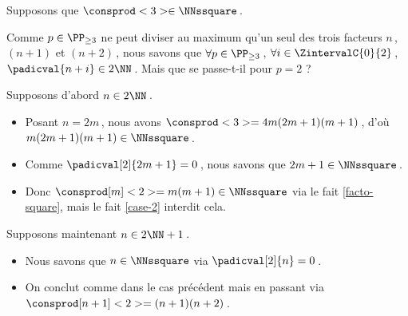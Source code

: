 Supposons que $\consprod<3> \in \NNssquare$\,.

\smallskip

Comme $p \in \PP_{\geq 3}$ ne peut diviser au maximum qu'un seul des trois facteurs $n$\,, $(n+1)$ et $(n+2)$\,, nous savons que 
$\forall p \in \PP_{\geq 3}$\,, 
$\forall i \in \ZintervalC{0}{2}$\,, 
$\padicval{n + i} \in 2 \NN$\,.
Mais que se passe-t-il pour $p = 2$ ?

\medskip

Supposons d'abord $n \in 2 \NN$\,.
%
\begin{itemize}
	\item Posant $n = 2 m$\,, nous avons $\consprod<3> = 4 m(2m+1)(m+1)$\,, d'où $m(2m+1)(m+1) \in \NNssquare$\,.
		
	\item Comme $\padicval[2]{2m+1} = 0$\,, nous savons que $2m+1 \in \NNssquare$\,.
		
	\item Donc $\consprod[m]<2> = m(m+1)\in \NNssquare$ via le fait \ref{facto-square}, mais le fait \ref{case-2} interdit cela.
\end{itemize}

\medskip

Supposons maintenant $n \in 2 \NN + 1$\,.
%
\begin{itemize}
	\item Nous savons que $n \in \NNssquare$ via $\padicval[2]{n} = 0$\,.

	\item On conclut comme dans le cas précédent mais en passant via $\consprod[n+1]<2>=(n+1)(n+2)$\,. \qedhere
\end{itemize}
